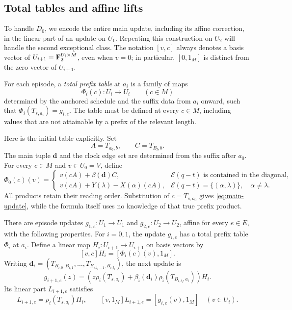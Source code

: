 \subsection{Total tables and affine lifts}

To handle $D_0$, we encode the entire main update, including its affine
correction, in the linear part of an update on $U_1$. Repeating this
construction on $U_2$ will handle the second exceptional class. The
notation $[v,c]$ always denotes a basis vector of
$U_{i+1}=\mathbf F_2^{U_i\times M}$, even when $v=0$; in particular,
$[0,1_M]$ is distinct from the zero vector of $U_{i+1}$.

For each episode, a \emph{total prefix table} at $a_i$ is a family of
maps
\[
 \Phi_i(c):U_i\longrightarrow U_i\qquad(c\in M)
\]
determined by the anchored schedule and the suffix data from $a_i$
onward, such that
$\Phi_i(T_{s,a_i})=g_{i,e}$.
The table must be defined at every $c\in M$, including values that are
not attainable by a prefix of the relevant length.

Here is the initial table explicitly.  Set
\[
 A=T_{a_0,b},\qquad C=T_{B_l,b}.
\]
The main tuple $\mathbf d$ and the clock edge set are determined from
the suffix after $a_0$.  For every $c\in M$ and $v\in U_0=V$, define
\begin{equation}
\label{eq:initial-prefix-table}
 \Phi_0(c)(v)=
 \begin{cases}
 v(cA)+\beta(\mathbf d)C,
       &\mathcal E(q-t)\text{ is contained in the diagonal},\\[2mm]
 v(cA)+Y(\lambda)-X(\alpha)(cA),
       &\mathcal E(q-t)=\{(\alpha,\lambda)\},\quad\alpha\ne\lambda.
 \end{cases}
\end{equation}
All products retain their reading order.  Substitution of
$c=T_{s,a_0}$ gives \eqref{eq:main-update}, while the formula itself
uses no knowledge of that true prefix product.

\begin{lemma}
\label{lem:table-lift}
There are episode updates $g_{1,e}:U_1\to U_1$ and
$g_{2,e}:U_2\to U_2$, affine for every $e\in E$, with the following
properties.  For $i=0,1$, the update $g_{i,e}$ has a total prefix table
$\Phi_i$ at $a_i$.  Define a linear map $H_i:U_{i+1}\to U_{i+1}$ on
basis vectors by
\[
 [v,c]H_i=[\Phi_i(c)(v),1_M].
\]
Writing
$\mathbf d_i=(T_{B_{i,0},B_{i,1}},\ldots,
               T_{B_{i,l_i-1},B_{i,l_i}})$,
the next update is
\begin{equation}
\label{eq:lift-update}
 g_{i+1,e}(z)=
 \left(z\rho_i(T_{s,a_i})
       +\beta_i(\mathbf d_i)\rho_i(T_{B_{i,l_i},a_i})\right)H_i.
\end{equation}
Its linear part $L_{i+1,e}$ satisfies
\begin{equation}
\label{eq:lift-linear-part}
 L_{i+1,e}=\rho_i(T_{s,a_i})H_i,
 \qquad
 [v,1_M]L_{i+1,e}=[g_{i,e}(v),1_M]
 \quad(v\in U_i).
\end{equation}
\end{lemma}

